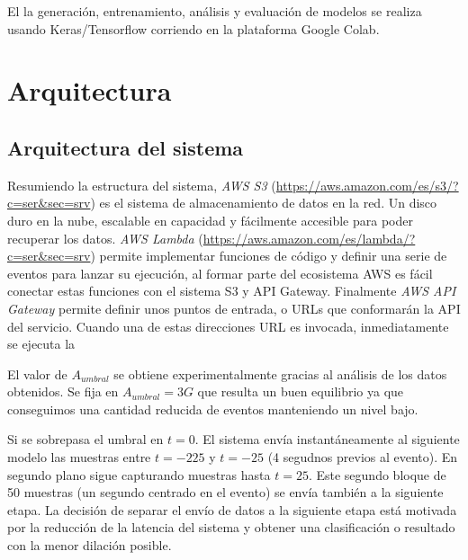 El la generación, entrenamiento, análisis y evaluación de modelos se realiza usando Keras/Tensorflow corriendo en la plataforma Google Colab.

\section{Arquitectura}\label{desc_archi}

\subsection{Arquitectura del sistema}

Resumiendo la estructura del sistema, \textit{AWS S3} (\url{https://aws.amazon.com/es/s3/?c=ser&sec=srv}) es el sistema de almacenamiento de datos en la red. Un disco duro en la nube, escalable en capacidad y fácilmente accesible para poder recuperar los datos. \textit{AWS Lambda} (\url{https://aws.amazon.com/es/lambda/?c=ser&sec=srv}) permite implementar funciones de código y definir una serie de eventos para lanzar su ejecución, al formar parte del ecosistema AWS es fácil conectar estas funciones con el sistema S3 y API Gateway. Finalmente \textit{AWS API Gateway} permite definir unos puntos de entrada, o URLs que conformarán la API del servicio. Cuando una de estas direcciones URL es invocada, inmediatamente se ejecuta la 



El valor de $A_{umbral}$ se obtiene experimentalmente gracias al análisis de los datos obtenidos. Se fija en $A_{umbral} = 3G$ que resulta un buen equilibrio ya que conseguimos una cantidad reducida de eventos manteniendo un nivel bajo. 

Si se sobrepasa el umbral en $t=0$. El sistema envía instantáneamente al siguiente modelo las muestras entre $t=-225$ y $t=-25$ (4 segudnos previos al evento). En segundo plano sigue capturando muestras hasta $t=25$. Este segundo bloque de 50 muestras (un segundo centrado en el evento) se envía también a la siguiente etapa. La decisión de separar el envío de datos a la siguiente etapa está motivada por la reducción de la latencia del sistema y obtener una clasificación o resultado con la menor dilación posible.



